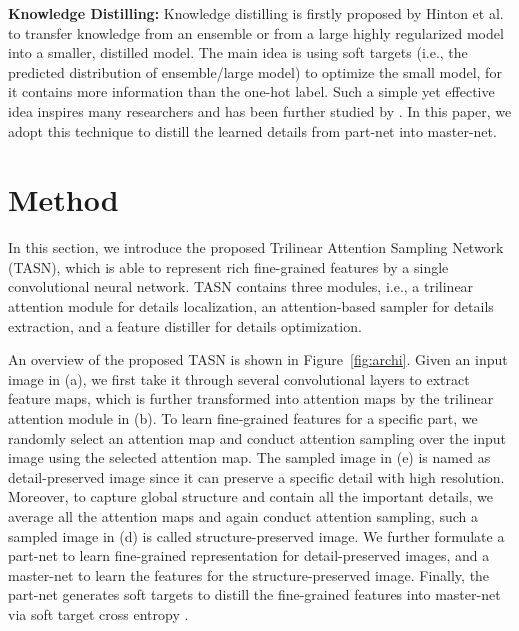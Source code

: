 \documentclass[10pt,twocolumn,letterpaper]{article}
\begin{document}
\textbf{Knowledge Distilling:}
Knowledge distilling is firstly proposed by Hinton et al. \cite{hinton2014distilling} to transfer knowledge from an ensemble or from a large highly regularized model into a smaller, distilled model. The main idea is using soft targets (i.e., the predicted distribution of ensemble/large model) to optimize the small model, for it contains more information than the one-hot label. Such a simple yet effective idea inspires many researchers and has been further studied by \cite{DBLP:journals/corr/abs-1805-05532,yim2017gift}. In this paper, we adopt this technique to distill the learned details from part-net into master-net.

\section{Method}
\label{method}

In this section, we introduce the proposed Trilinear Attention Sampling Network (TASN), which is able to represent rich fine-grained features by a single convolutional neural network. TASN contains three modules, i.e., a trilinear attention module for details localization, an attention-based sampler for details extraction, and a feature distiller for details optimization.

An overview of the proposed TASN is shown in Figure~\ref{fig:archi}. Given an input image in (a), we first take it through several convolutional layers to extract feature maps, which is further transformed into attention maps by the trilinear attention module in (b). To learn fine-grained features for a specific part, we randomly select an attention map and conduct attention sampling over the input image using the selected attention map. The sampled image in (e) is named as detail-preserved image since it can preserve a specific detail with high resolution. Moreover, to capture global structure and contain all the important details, we average all the attention maps and again conduct attention sampling, such a sampled image in (d) is called structure-preserved image. We further formulate a part-net to learn fine-grained representation for detail-preserved images, and a master-net to learn the features for the structure-preserved image. Finally, the part-net generates soft targets to distill the fine-grained features into master-net via soft target cross entropy \cite{hinton2014distilling}.
\end{document}
